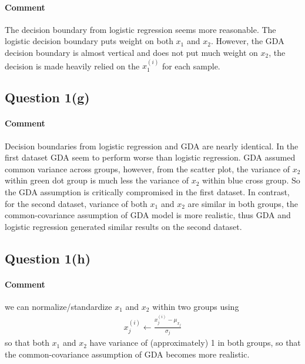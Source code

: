 \documentclass[11pt]{article}
\newcommand{\upi}[0]{^{(i)}}
\begin{document}
	\paragraph{Comment} The decision boundary from logistic regression seems more reasonable. The logistic decision boundary puts weight on both $x_1$ and $x_2$. However, the GDA decision boundary is almost vertical and does not put much weight on $x_2$, the decision is made heavily relied on the $x_1\upi$ for each sample.
	
	\subsection{Question 1(g)}
%

	\paragraph{Comment} Decision boundaries from logistic regression and GDA are nearly identical. In the first dataset GDA seem to perform worse than logistic regression. GDA assumed common variance across groups, however, from the scatter plot, the variance of $x_2$ within green dot group is much less the variance of $x_2$ within blue cross group. So the GDA assumption is critically compromised in the first dataset. In contrast, for the second dataset, variance of both $x_1$ and $x_2$ are similar in both groups, the common-covariance assumption of GDA model is more realistic, thus GDA and logistic regression generated similar results on the second dataset.
	
	\subsection{Question 1(h)}
	\paragraph{Comment} we can normalize/standardize $x_1$ and $x_2$ within two groups using 
	\begin{align}
		x\upi_j \leftarrow \frac{x\upi_j - \mu_{x_j}}{\sigma_j}
	\end{align}
	so that both $x_1$ and $x_2$ have variance of (approximately) 1 in both groups, so that the common-covariance assumption of GDA becomes more realistic.
	
\end{document}
